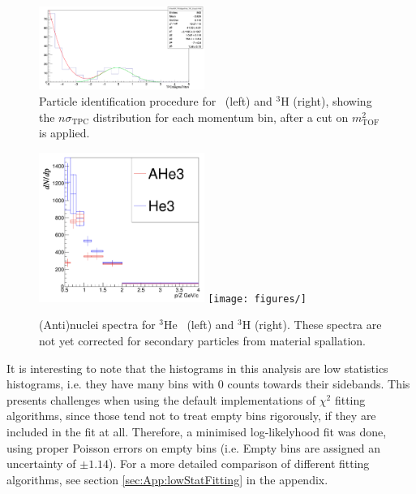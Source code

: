 \begin{figure}
    \includegraphics[width=0.48\textwidth]{figures/triton/Triton_TPCnSigma_Bin4.png}
    \caption{Particle identification procedure for \atrit\ (left) and $^3\mathrm{H}$ (right), showing the $n\sigma_{\mathrm{TPC}}$ distribution for each momentum bin, after a cut on $m_{\mathrm{TOF}}^2$ is applied.}
    \label{fig:h3_TPC_PID}
\end{figure}

\begin{figure}
    \centering
    \includegraphics[width=0.48\textwidth]{figures/he3_spectra.png}
    \texttt{[image: figures/]}
    \caption{(Anti)nuclei spectra for $^3\mathrm{He}$ \ahe\ (left) and $^3\mathrm{H}$ \atrit (right). These spectra are not yet corrected for secondary particles from material spallation.}
    \label{fig:(anti)nucleiSpectra}
\end{figure}


\begin{table}
\end{table}

It is interesting to note that the histograms in this analysis are low statistics histograms, i.e. they have many bins with 0 counts towards their sidebands. This presents challenges when using the default implementations of $\chi^2$ fitting algorithms, since those tend not to treat empty bins rigorously, if they are included in the fit at all. Therefore, a minimised log-likelyhood fit was done, using proper Poisson errors on empty bins (i.e. Empty bins are assigned an uncertainty of $\pm 1.14$). For a more detailed comparison of different fitting algorithms, see section \ref{sec:App:lowStatFitting} in the appendix.

